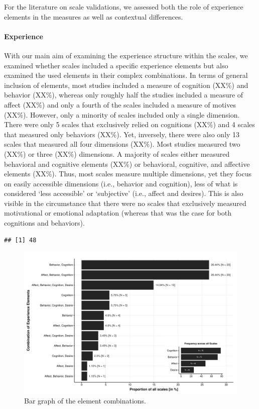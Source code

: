 For the literature on scale validations, we assessed both the role of
experience elements in the measures as well as contextual differences.

\paragraph{Experience}

With our main aim of examining the experience structure within the
scales, we examined whether scales included a specific experience
elements but also examined the used elements in their complex
combinations. In terms of general inclusion of elements, most studies
included a measure of cognition (XX\%) and behavior (XX\%), whereas only
roughly half the studies included a measure of affect (XX\%) and only a
fourth of the scales included a measure of motives (XX\%). However, only
a minority of scales included only a single dimension. There were only 5
scales that exclusively relied on cognitions (XX\%) and 4 scales that
measured only behaviors (XX\%). Yet, inversely, there were also only 13
scales that measured all four dimensions (XX\%). Most studies measured
two (XX\%) or three (XX\%) dimensions. A majority of scales either
measured behavioral and cognitive elements (XX\%) or behavioral,
cognitive, and affective elements (XX\%). Thus, most scales measure
multiple dimensions, yet they focus on easily accessible dimensions
(i.e., behavior and cognition), less of what is considered `less
accessible' or `subjective' (i.e., affect and desires). This is also
visible in the circumstance that there were no scales that exclusively
measured motivational or emotional adaptation (whereas that was the case
for both cognitions and behaviors).

\begin{verbatim}
## [1] 48
\end{verbatim}

\begin{figure}
\centering
\includegraphics{Figures/ABCDFreq-1.pdf}
\caption{Bar graph of the element combinations.}
\end{figure}

